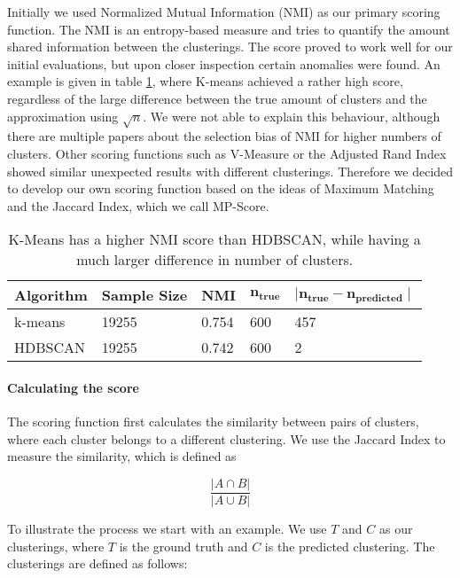 Initially we used Normalized Mutual Information (NMI) as our primary scoring function.
The NMI is an entropy-based measure and tries to quantify the amount shared information between the clusterings.
The score proved to work well for our initial evaluations, but upon closer inspection certain anomalies were found.
An example is given in table \ref{tab:nmi_kmeans_example}, where K-means achieved a rather high score,
regardless of the large difference between the true amount of clusters and the approximation using $\sqrt{n}$.
We were not able to explain this behaviour,
although there are multiple papers about the selection bias of NMI for higher numbers of clusters\cite{LEI201758}\cite{clustering_anmi}.
Other scoring functions such as V-Measure or the Adjusted Rand Index showed similar unexpected results with different clusterings.
Therefore we decided to develop our own scoring function based on the ideas of Maximum Matching\cite{data_mining}
and the Jaccard Index, which we call MP-Score.

\begin{table}[h]
    \centering
    \begin{tabular}{|l|l|l|l|l|}
    \hline
    \textbf{Algorithm} & \textbf{Sample Size} & \textbf{NMI}  & $\mathbf{n_{true}}$ & $\mathbf{ \mid n_{true} - n_{predicted} \mid }$ \\ \hline
    k-means & 19255 & 0.754 & 600 & 457 \\ \hline
    HDBSCAN & 19255 & 0.742 & 600 & 2 \\ \hline
    \end{tabular}
    \caption{K-Means has a higher NMI score than HDBSCAN, while having a much larger difference in number of clusters.}
    \label{tab:nmi_kmeans_example}
\end{table}

\paragraph{Calculating the score}
The scoring function first calculates the similarity between pairs of clusters,
where each cluster belongs to a different clustering.
We use the Jaccard Index to measure the similarity, which is defined as

\begin{equation}
    \label{equ:similarity}
    \frac{|A \cap B|}{|A \cup B|}
\end{equation}

To illustrate the process we start with an example.
We use $T$ and $C$ as our clusterings, where $T$ is the ground truth and $C$ is the predicted clustering.
The clusterings are defined as follows:

